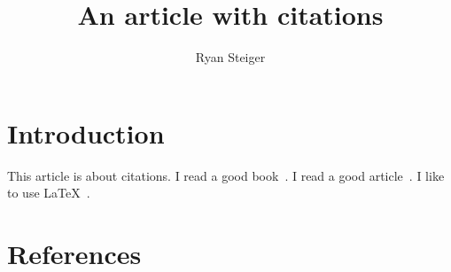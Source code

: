 \documentclass{article}
\title{An article with citations}
\author{Ryan Steiger}
\date{}
\begin{document}
\maketitle

\section{Introduction}

This article is about citations. I read a good book~\cite{smith2020}. I read a good article~\cite{hall2020}. I like to use \LaTeX~\cite{latex}.

\section{References}



\end{document}
